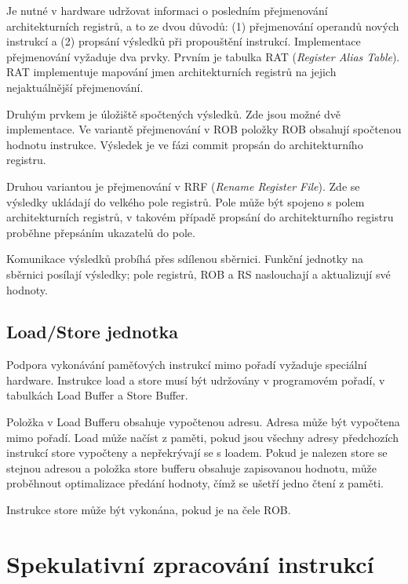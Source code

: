 Je nutné v hardware udržovat informaci o posledním přejmenování architekturních registrů, a to ze dvou důvodů: (1) přejmenování operandů nových instrukcí a (2) propsání výsledků při propouštění instrukcí.
Implementace přejmenování vyžaduje dva prvky.
Prvním je tabulka RAT (\emph{Register Alias Table}).
RAT implementuje mapování jmen architekturních registrů na jejich nejaktuálnější přejmenování.

Druhým prvkem je úložiště spočtených výsledků.
Zde jsou možné dvě implementace.
Ve variantě přejmenování v ROB položky ROB obsahují spočtenou hodnotu instrukce.
Výsledek je ve fázi commit propsán do architekturního registru.

Druhou variantou je přejmenování v RRF (\emph{Rename Register File}).
Zde se výsledky ukládají do velkého pole registrů.
Pole může být spojeno s polem architekturních registrů, v takovém případě propsání do architekturního registru proběhne přepsáním ukazatelů do pole.

Komunikace výsledků probíhá přes sdílenou sběrnici.
Funkční jednotky na sběrnici posílají výsledky; pole registrů, ROB a RS naslouchají a aktualizují své hodnoty.

\subsection{Load/Store jednotka}
\label{ooo_ls}

Podpora vykonávání paměťových instrukcí mimo pořadí vyžaduje speciální hardware.
Instrukce load a store musí být udržovány v programovém pořadí, v tabulkách Load Buffer a Store Buffer.

Položka v Load Bufferu obsahuje vypočtenou adresu.
Adresa může být vypočtena mimo pořadí.
Load může načíst z paměti, pokud jsou všechny adresy předchozích instrukcí store vypočteny a nepřekrývají se s loadem.
Pokud je nalezen store se stejnou adresou a položka store bufferu obsahuje zapisovanou hodnotu, může proběhnout optimalizace předání hodnoty, čímž se ušetří jedno čtení z paměti.

Instrukce store může být vykonána, pokud je na čele ROB.

\section{Spekulativní zpracování instrukcí}

